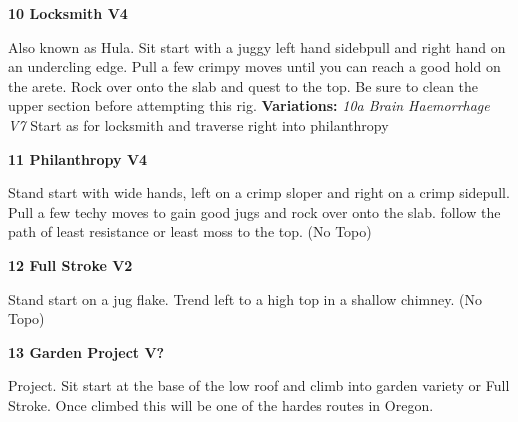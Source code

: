 \begin{multicols*}{2}
					\label{rt:Locksmith} \colorbox{RoyalBlue!20}{\textbf{10 Locksmith V4 \ding{72}    \warn \warn }}
					\begin{adjustwidth}{1cm}{}
					Also known as Hula. Sit start with a juggy left hand sidebpull and right hand on an undercling edge. Pull a few crimpy moves until you can reach a good hold on the arete. Rock over onto the slab and quest to the top. Be sure to clean the upper section before attempting this rig.
					\newline \textbf{Variations:} \newline
						\label{vr:Brain Haemorrhage} \colorbox{Goldenrod!50}{\emph{10a Brain Haemorrhage V7  }}
						Start as for locksmith and traverse right into philanthropy
					\end{adjustwidth}
					\label{rt:Philanthropy} \colorbox{RoyalBlue!20}{\textbf{11 Philanthropy V4   \warn \warn }}
					\begin{adjustwidth}{1cm}{}
					Stand start with wide hands, left on a crimp sloper and right on a crimp sidepull. Pull a few techy moves to gain good jugs and rock over onto the slab. follow the path of least resistance or least moss to the top.
						\newline (No Topo) 
					\end{adjustwidth}
					\label{rt:Full Stroke} \colorbox{green!20}{\textbf{12 Full Stroke V2 \ding{72}   \warn }}
					\begin{adjustwidth}{1cm}{}
					Stand start on a jug flake. Trend left to a high top in a shallow chimney.
						\newline (No Topo) 
					\end{adjustwidth}
					\label{rt:Garden Project} \colorbox{black!20}{\textbf{13 Garden Project V?  }}
					\begin{adjustwidth}{1cm}{}
					Project. Sit start at the base of the low roof and climb into garden variety or Full Stroke. Once climbed this will be one of the hardes routes in Oregon.
					\end{adjustwidth}


\end{multicols*}
